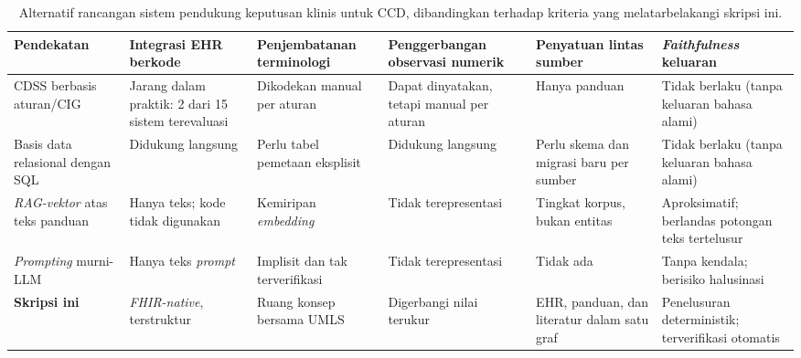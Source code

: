 \begin{table}[h]
\centering
\caption{Alternatif rancangan sistem pendukung keputusan klinis untuk CCD, dibandingkan
terhadap kriteria yang melatarbelakangi skripsi ini.}
\label{tab:method-comparison}
\footnotesize
\setlength{\tabcolsep}{3pt}
\begin{tabular}{p{2.0cm}p{2.28cm}p{2.28cm}p{2.28cm}p{2.28cm}p{2.28cm}}
\hline
\textbf{Pendekatan} & \textbf{Integrasi EHR berkode} & \textbf{Penjembatanan terminologi} &
\textbf{Penggerbangan observasi numerik} & \textbf{Penyatuan lintas sumber} &
\textbf{\emph{Faithfulness} keluaran} \\
\hline
CDSS berbasis aturan/CIG &
Jarang dalam praktik: 2 dari 15 sistem terevaluasi \cite{papadopoulos2022} &
Dikodekan manual per aturan &
Dapat dinyatakan, tetapi manual per aturan &
Hanya panduan &
Tidak berlaku (tanpa keluaran bahasa alami) \\
Basis data relasional dengan SQL &
Didukung langsung &
Perlu tabel pemetaan eksplisit &
Didukung langsung &
Perlu skema dan migrasi baru per sumber &
Tidak berlaku (tanpa keluaran bahasa alami) \\
\emph{RAG-vektor} atas teks panduan &
Hanya teks; kode tidak digunakan &
Kemiripan \emph{embedding} &
Tidak terepresentasi &
Tingkat korpus, bukan entitas &
Aproksimatif; berlandas potongan teks tertelusur \\
\emph{Prompting} murni-LLM &
Hanya teks \emph{prompt} &
Implisit dan tak terverifikasi &
Tidak terepresentasi &
Tidak ada &
Tanpa kendala; berisiko halusinasi \\
\textbf{Skripsi ini} &
\emph{FHIR-native}, terstruktur &
Ruang konsep bersama UMLS &
Digerbangi nilai terukur &
EHR, panduan, dan literatur dalam satu graf &
Penelusuran deterministik; terverifikasi otomatis \\
\hline
\end{tabular}
\end{table}

